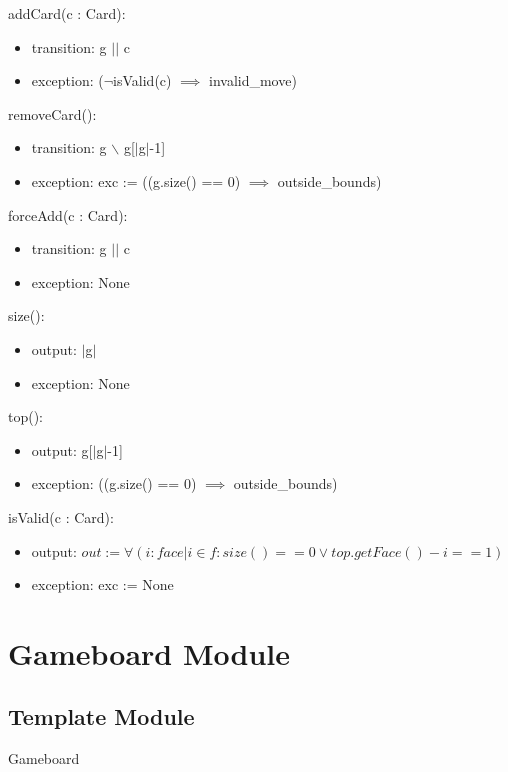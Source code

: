 \documentclass[12pt]{article}
\begin{document}
\noindent addCard(c : Card):
\begin{itemize}
	\item transition: g $||$ c
	\item exception: ($\lnot$isValid(c) $\implies$ invalid\_move)
\end{itemize}

\noindent removeCard():
\begin{itemize}
	\item transition: g $\backslash$ g[$|$g$|$-1]
	\item exception: exc := ((g.size() == 0) $\implies$ outside\_bounds)
\end{itemize}

\noindent forceAdd(c : Card):
\begin{itemize}
	\item transition: g $||$ c
	\item exception: None
\end{itemize}

\noindent size():
\begin{itemize}
	\item output: $|$g$|$
	\item exception: None
\end{itemize}

\noindent top():
\begin{itemize}
	\item output: g[$|$g$|$-1]
	\item exception: ((g.size() == 0) $\implies$ outside\_bounds)
\end{itemize}

\noindent isValid(c : Card):
\begin{itemize}
	\item output: $out := \forall(i : face| i \in f: size() == 0 \lor top.getFace() - i == 1)$
	\item exception: exc := None
\end{itemize}

\newpage

\section* {Gameboard Module}

\subsection*{Template Module}

Gameboard
\end{document}
